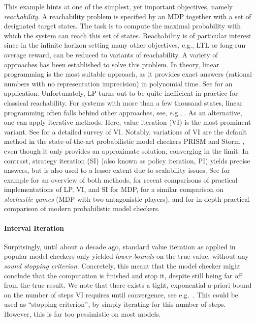 \documentclass{theoretics}
\begin{document}
This example hints at one of the simplest, yet important objectives, namely \emph{reachability}.
A reachability problem is specified by an MDP together with a set of designated target states.
The task is to compute the maximal probability with which the system can reach this set of states.
Reachability is of particular interest since in the infinite horizon setting many other objectives, e.g., LTL or long-run average reward, can be reduced to variants of reachability.
A variety of approaches has been established to solve this problem.
In theory, linear programming \cite{10.1007/BFb0032043,DBLP:conf/sfm/ForejtKNP11} is the most suitable approach, as it provides exact answers (rational numbers with no representation imprecision) in polynomial time.
See \cite{DBLP:conf/qest/BarnatBCCT08} for an application.
Unfortunately, LP turns out to be quite inefficient in practice for classical reachability.
For systems with more than a few thousand states, linear programming often falls behind other approaches, see, e.g., \cite{DBLP:conf/sfm/ForejtKNP11,DBLP:conf/cav/AshokCDKM17,DBLP:conf/tacas/HartmannsJQW23}.
As an alternative, one can apply iterative methods.
Here, value iteration (VI) \cite{howard1960dynamic} is the most prominent variant.
See \cite{DBLP:conf/spin/ChatterjeeH08} for a detailed survey of VI.
Notably, variations of VI are the default method in the state-of-the-art probabilistic model checkers PRISM \cite{DBLP:conf/cav/KwiatkowskaNP11} and Storm \cite{DBLP:conf/cav/DehnertJK017}, even though it only provides an approximate solution, converging in the limit.
In contrast, strategy iteration (SI) (also known as policy iteration, PI) \cite{howard1960dynamic,DBLP:books/wi/Puterman94,DBLP:conf/atva/KretinskyM17} yields precise answers, but is also used to a lesser extent due to scalability issues.
See for example \cite{DBLP:journals/tnn/Bertsekas17} for an overview of both methods, \cite{DBLP:conf/tacas/HartmannsJQW23,practitionersJournalPreprint} for recent comparisons of practical implementations of LP, VI, and SI for MDP, \cite{DBLP:journals/iandc/KretinskyRSW22} for a similar comparison on \emph{stochastic games} (MDP with two antagonistic players), and \cite{qcomp2023} for in-depth practical comparison of modern probabilistic model checkers.

\paragraph{Interval Iteration}
Surprisingly, until about a decade ago, standard value iteration as applied in popular model checkers only yielded \emph{lower bounds} on the true value, without any \emph{sound stopping criterion}.
Concretely, this meant that the model checker might conclude that the computation is finished and stop it, despite still being far off from the true result.
We note that there exists a tight, exponential a-priori bound on the number of steps VI requires until convergence, see e.g.\ \cite{DBLP:conf/spin/ChatterjeeH08}.
This could be used as \enquote{stopping criterion}, by simply iterating for this number of steps.
However, this is far too pessimistic on most models.
\end{document}
